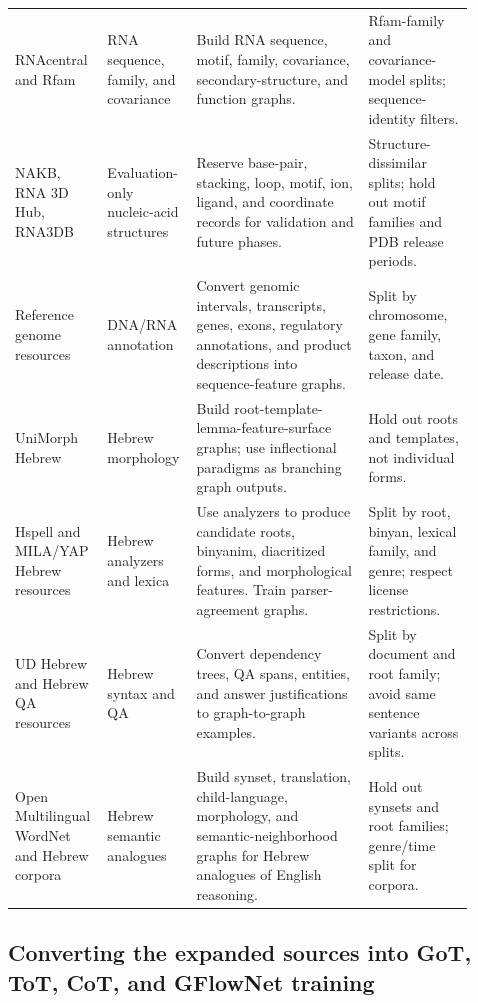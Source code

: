 \documentclass[11pt]{article}
\newcommand{\1}{\mathbf{1}}
\begin{document}
{\begin{longtable}{p{0.17\linewidth}p{0.16\linewidth}p{0.36\linewidth}p{0.22\linewidth}}
RNAcentral and Rfam \cite{RNAcentral2024,Rfam2025} & RNA sequence, family, and covariance & Build RNA sequence, motif, family, covariance, secondary-structure, and function graphs. & Rfam-family and covariance-model splits; sequence-identity filters. \\
NAKB, RNA 3D Hub, RNA3DB \cite{NAKB2024,RNA3DHub2025,RNA3DB2024} & Evaluation-only nucleic-acid structures & Reserve base-pair, stacking, loop, motif, ion, ligand, and coordinate records for validation and future phases. & Structure-dissimilar splits; hold out motif families and PDB release periods. \\
Reference genome resources \cite{NCBINucleotide2026,GenBank2026,Ensembl2026,GENCODE2026} & DNA/RNA annotation & Convert genomic intervals, transcripts, genes, exons, regulatory annotations, and product descriptions into sequence-feature graphs. & Split by chromosome, gene family, taxon, and release date. \\
UniMorph Hebrew \cite{UniMorph2024,UniMorphHebrew2026} & Hebrew morphology & Build root-template-lemma-feature-surface graphs; use inflectional paradigms as branching graph outputs. & Hold out roots and templates, not individual forms. \\
Hspell and MILA/YAP Hebrew resources \cite{Hspell2026,MILA2008,YAP2026} & Hebrew analyzers and lexica & Use analyzers to produce candidate roots, binyanim, diacritized forms, and morphological features. Train parser-agreement graphs. & Split by root, binyan, lexical family, and genre; respect license restrictions. \\
UD Hebrew and Hebrew QA resources \cite{UDHebrewIAHLT2026,HebrewQANLP2024} & Hebrew syntax and QA & Convert dependency trees, QA spans, entities, and answer justifications to graph-to-graph examples. & Split by document and root family; avoid same sentence variants across splits. \\
Open Multilingual WordNet and Hebrew corpora \cite{OpenMultilingualWordNet2012,HebrewCHILDES2013} & Hebrew semantic analogues & Build synset, translation, child-language, morphology, and semantic-neighborhood graphs for Hebrew analogues of English reasoning. & Hold out synsets and root families; genre/time split for corpora. \\
\bottomrule
\end{longtable}}

\subsection{Converting the expanded sources into GoT, ToT, CoT, and GFlowNet training}
\label{sec:gflow-dataset-conversion}
\end{document}
